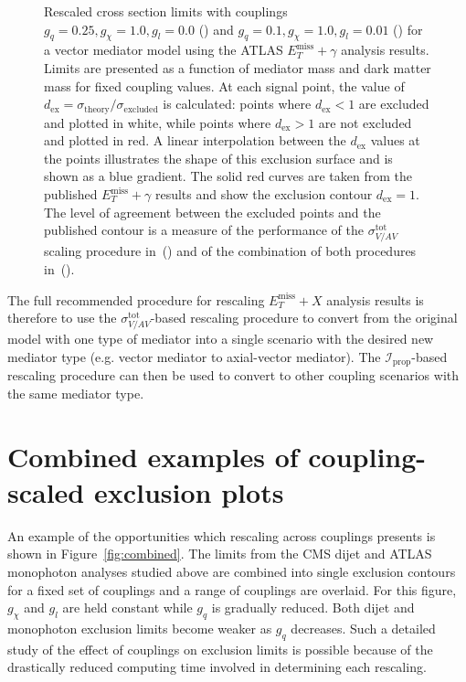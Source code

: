 \documentclass[a4paper, 11pt]{article}
\newcommand{\MET}{\ensuremath{E_T^\mathrm{miss}}\xspace}
\newcommand{\met}{\MET}
\newcommand{\metplusx}{\ensuremath{\MET+X}\xspace}
\begin{document}
\begin{figure}[htp!]
\begin{center}
  \caption{Rescaled cross section limits with couplings $g_q=0.25, g_\chi=1.0, g_l = 0.0$ () and $g_q=0.1, g_\chi=1.0, g_l = 0.01$ () for a vector mediator model using the ATLAS $\met+\gamma$ analysis results. Limits are presented as a function of mediator mass and dark matter mass for fixed coupling values. At each signal point, the value of $d_\text{ex} = \sigma_{\text{theory}}/\sigma_{\text{excluded}}$ is calculated: points where $d_\text{ex}<1$ are excluded and plotted in white, while points where $d_\text{ex}>1$ are not excluded and plotted in red. A linear interpolation between the $d_\text{ex}$ values at the points illustrates the shape of this exclusion surface and is shown as a blue gradient. The solid red curves are taken from the published $\met+\gamma$ results and show the exclusion contour $d_\text{ex} = 1$. The level of agreement between the excluded points and the published contour is a measure of the performance of the $\sigma_{V/AV}^{\text{tot}}$ scaling procedure in~() and of the combination of both procedures in~().
  }
  \label{fig:pdf_scaling}
  \end{center}
\end{figure}

The full recommended procedure for rescaling \metplusx analysis results is therefore to use the $\sigma_{V/AV}^{\text{tot}}$-based rescaling procedure to convert from the original model with one type of mediator into a single scenario with the desired new mediator type (e.g. vector mediator to axial-vector mediator). The $\mathcal{I}_{\text{prop}}$-based rescaling procedure can then be used to convert to other coupling scenarios with the same mediator type.

\section{Combined examples of coupling-scaled exclusion plots}

An example of the opportunities which rescaling across couplings presents is shown in Figure~\ref{fig:combined}. The limits from the CMS dijet and ATLAS monophoton analyses studied above are combined into single exclusion contours for a fixed set of couplings and a range of couplings are overlaid. For this figure, $g_\chi$ and $g_l$ are held constant while $g_q$ is gradually reduced. Both dijet and monophoton exclusion limits become weaker as $g_q$ decreases. Such a detailed study of the effect of couplings on exclusion limits is possible because of the drastically reduced computing time involved in determining each rescaling.
\end{document}
